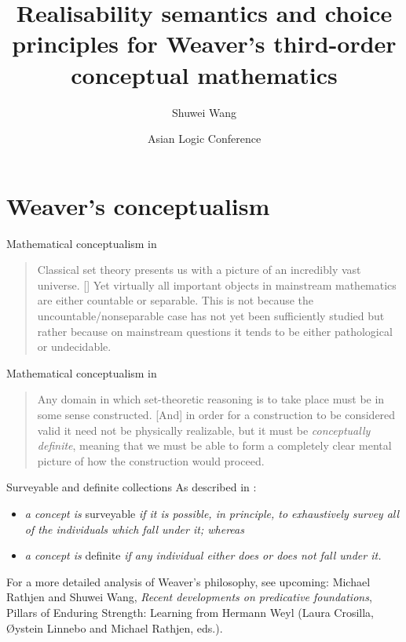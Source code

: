 \documentclass{beamer}
\title{Realisability semantics and choice principles for Weaver's third-order conceptual mathematics}
\author{Shuwei Wang}
\institute{University of Leeds}
\date{{\small Asian Logic Conference}\\\DTMdate{2025-09-09}}
\theoremstyle{definition}
\begin{document}
\begin{frame}
  \titlepage
\end{frame}

\section{Weaver's conceptualism}

\begin{frame}{Mathematical conceptualism in \cite{weaver05-conceptualism}}
  \begin{quote}
    Classical set theory presents us with a picture of an incredibly vast universe. [\textellipsis] Yet virtually all important objects in mainstream mathematics are either countable or separable. This is not because the uncountable/nonseparable case has not yet been sufficiently studied but rather because on mainstream questions it tends to be either pathological or undecidable.
  \end{quote}
\end{frame}

\begin{frame}{Mathematical conceptualism in \cite{weaver05-conceptualism}}
  \begin{quote}
    Any domain in which set-theoretic reasoning is to take place must be in some sense constructed. [\textellipsis And] in order for a construction to be considered valid it need not be physically realizable, but it must be \emph{conceptually definite}, meaning that we must be able to form a completely clear mental picture of how the construction would proceed.
  \end{quote}
\end{frame}

\begin{frame}{Surveyable and definite collections}
  As described in \cite{weaver11-kinds-of-concepts}:
  \begin{itemize}
    \item \textit{a concept is} surveyable \textit{if it is possible, in principle, to exhaustively survey all of the individuals which fall under it; whereas}
    \item \textit{a concept is} definite \textit{if any individual either does or does not fall under it.}
  \end{itemize}

  \vspace{2em}

  {\small For a more detailed analysis of Weaver's philosophy, see upcoming: Michael Rathjen and Shuwei Wang, \emph{Recent developments on predicative foundations}, Pillars of Enduring Strength: Learning from Hermann Weyl (Laura Crosilla, \O{}ystein Linnebo and Michael Rathjen, eds.).}
\end{frame}
\end{document}
